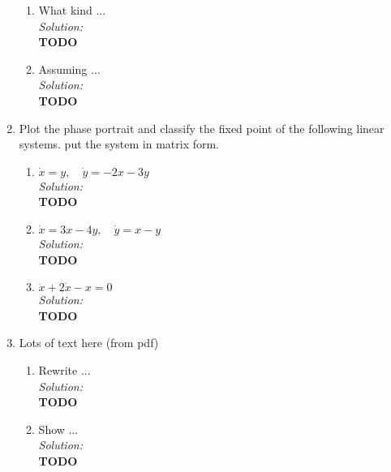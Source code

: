 \documentclass[10pt]{amsart}
\theoremstyle{nonumberplain}
\begin{document}
\begin{enumerate}[label={\bf {\arabic*}:}]
\begin{enumerate}
\item What kind ... \\
\textit{Solution:} \\
\textbf{TODO} \\

\item Assuming ... \\
\textit{Solution:} \\
\textbf{TODO} \\

\end{enumerate}

\newpage

\item Plot the phase portrait and classify the fixed point of the following linear systems. 
put the system in matrix form. \\

\begin{enumerate}

\item $\dot x = y, \quad \dot y = -2x - 3y$ \\
\textit{Solution:} \\
\textbf{TODO} \\

\item $\dot x = 3x - 4y, \quad \dot y = x - y$ \\
\textit{Solution:} \\
\textbf{TODO} \\

\item $\ddot x + 2\dot x - x = 0$ \\
\textit{Solution:} \\
\textbf{TODO} \\

\end{enumerate}

\newpage

\item Lots of text here (from pdf) \\

\begin{enumerate}

\item Rewrite ... \\
\textit{Solution:} \\
\textbf{TODO} \\

\item Show ... \\
\textit{Solution:} \\
\textbf{TODO} \\


\end{enumerate}
\end{enumerate}
\end{document}

